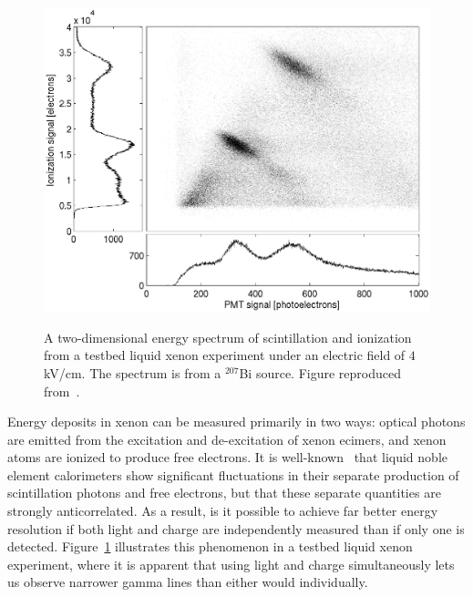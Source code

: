 \begin{figure}
\begin{center}
\includegraphics[keepaspectratio=true,width=\textwidth]{4kV_correl1.eps}
\end{center}
\renewcommand{\baselinestretch}{1}
\small\normalsize
\begin{quote}
\caption{A two-dimensional energy spectrum of scintillation and ionization from a testbed liquid xenon experiment under an electric field of $4$ kV/cm.  The spectrum is from a $^{207}$Bi source.  Figure reproduced from~\cite{PhysRevB.68.054201}.}
\label{fig:AnticorrelationInXenon}
\end{quote}
\end{figure}
\renewcommand{\baselinestretch}{2}
\small\normalsize

Energy deposits in xenon can be measured primarily in two ways: optical photons are emitted from the excitation and de-excitation of xenon ecimers, and xenon atoms are ionized to produce free electrons.  It is well-known~\cite{PhysRevB.68.054201} that liquid noble element calorimeters show significant fluctuations in their separate production of scintillation photons and free electrons, but that these separate quantities are strongly anticorrelated.  As a result, is it possible to achieve far better energy resolution if both light and charge are independently measured than if only one is detected. Figure~\ref{fig:AnticorrelationInXenon} illustrates this phenomenon in a testbed liquid xenon experiment, where it is apparent that using light and charge simultaneously lets us observe narrower gamma lines than either would individually.

